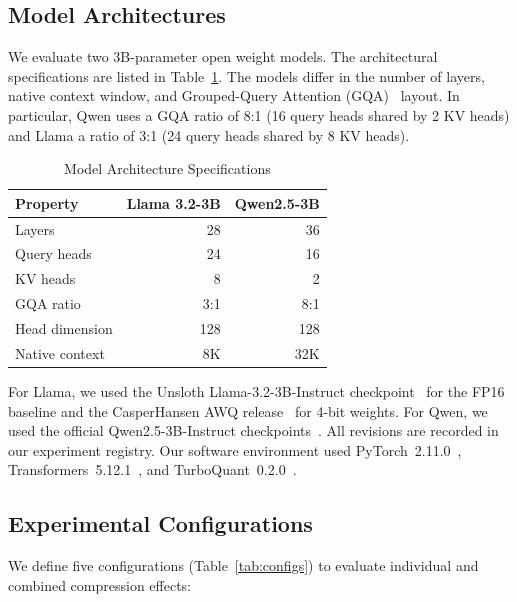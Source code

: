 \documentclass[sigconf,nonacm]{acmart}
\begin{document}
\subsection{Model Architectures}

We evaluate two 3B-parameter open weight models. The architectural specifications are listed in Table~\ref{tab:geometry}. The models differ in the number of layers, native context window, and Grouped-Query Attention (GQA)~\cite{ainslie2023gqa} layout. In particular, Qwen uses a GQA ratio of 8:1 (16 query heads shared by 2 KV heads) and Llama a ratio of 3:1 (24 query heads shared by 8 KV heads).
\begin{table}[htbp]
\caption{Model Architecture Specifications}
\label{tab:geometry}
\centering\small
\begin{tabular}{lrr}
\toprule
\textbf{Property} & \textbf{Llama 3.2-3B} & \textbf{Qwen2.5-3B} \\
\midrule
Layers              & 28  & 36  \\
Query heads         & 24  & 16  \\
KV heads            & 8   & 2   \\
GQA ratio           & 3:1 & 8:1 \\
Head dimension      & 128 & 128 \\
Native context      & 8K  & 32K \\
\bottomrule
\end{tabular}
\end{table}

For Llama, we used the Unsloth Llama-3.2-3B-Instruct checkpoint~\cite{unsloth_2024} for the FP16 baseline and the CasperHansen AWQ release~\cite{casperhansen_llama32_awq} for 4-bit weights. For Qwen, we used the official Qwen2.5-3B-Instruct checkpoints~\cite{qwen2024technical}. All revisions are recorded in our experiment registry. Our software environment used PyTorch~2.11.0~\cite{paszke2019pytorch}, Transformers~5.12.1~\cite{wolf2020transformers}, and TurboQuant~0.2.0~\cite{zandieh_turboquant_v020}.

\subsection{Experimental Configurations}

We define five configurations (Table~\ref{tab:configs}) to evaluate individual and combined compression effects:
\end{document}
